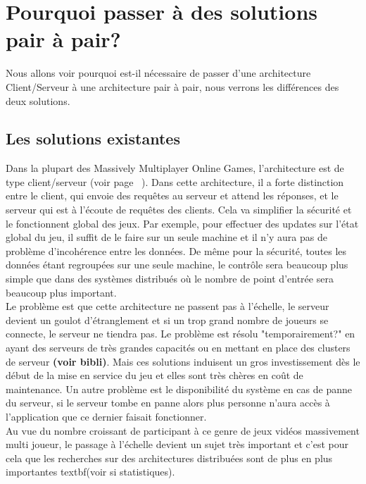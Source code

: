 \section{Pourquoi passer à des solutions pair à pair?}
	\label{whyp2p}
	Nous allons voir pourquoi est-il nécessaire de passer d'une architecture Client/Serveur à une architecture pair à pair, nous verrons les différences des deux solutions.
	\subsection{Les solutions existantes}
	Dans la plupart des Massively Multiplayer Online Games, l'architecture est de type client/serveur (voir page ~\pageref{P2P/ClServ}). Dans cette architecture, il a forte distinction entre le client, qui envoie des requêtes au serveur et attend les réponses, et le serveur qui est à l'écoute de requêtes des clients. Cela va simplifier la sécurité et le fonctionnent global des jeux. Par exemple, pour effectuer des updates sur l'état global du jeu, il suffit de le faire sur un seule machine et il n'y aura pas de problème d'incohérence entre les données. De même pour la sécurité, toutes les données étant regroupées sur une seule machine, le contrôle sera beaucoup plus simple que dans des systèmes distribués où le nombre de point d'entrée sera beaucoup plus important. \\
	Le problème est que cette architecture ne passent pas à l'échelle, le serveur devient un goulot d'étranglement et si un trop grand nombre de joueurs se connecte, le serveur ne tiendra pas. Le problème est résolu "temporairement?" en ayant des serveurs de très grandes capacités ou en mettant en place des clusters de serveur \textbf{(voir bibli)}. Mais ces solutions induisent un gros investissement dès le début de la mise en service du jeu et elles sont très chères en coût de maintenance. Un autre problème est le disponibilité du système en cas de panne du serveur, si le serveur tombe en panne alors plus personne n'aura accès à l'application que ce dernier faisait fonctionner. \\
	Au vue du nombre croissant de participant à ce genre de jeux vidéos massivement multi joueur, le passage à l'échelle devient un sujet très important et c'est pour cela que les recherches sur des architectures distribuées sont de plus en plus importantes textbf{(voir si statistiques)}. \\
\newline


